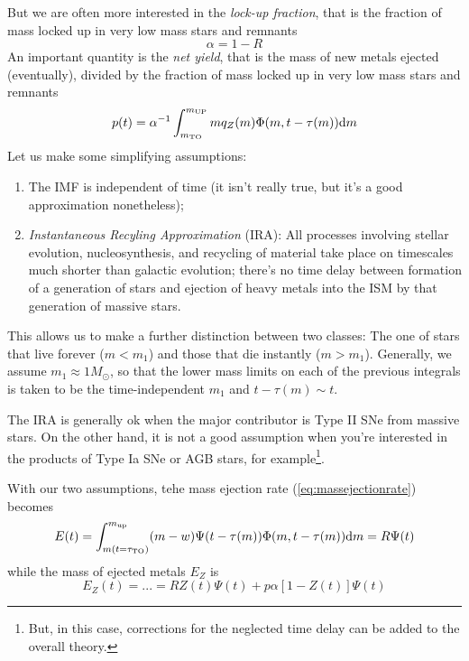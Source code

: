 But we are often more interested in the \emph{lock-up fraction}, that is the fraction of mass locked up in very low mass stars and remnants
\begin{equation}
    \alpha = 1-R
    \label{eq:lockup_fraction}
\end{equation}
An important quantity is the \emph{net yield}, that is the mass of new metals ejected (eventually), divided by the fraction of mass locked up in very low mass stars and remnants
\begin{equation}
    p(t) = \alpha^{-1}\int_{m_{\text{TO}}}^{m_{\text{UP}}} mq_{Z}(m)\Phi(m,t-\tau(m))\text{d}m
    \label{eq:netyield}
\end{equation}
Let us make some simplifying assumptions:
\begin{enumerate}
    \item The IMF is independent of time (it isn't really true, but it's a good approximation nonetheless);
    \item \emph{Instantaneous Recyling Approximation} (IRA): All processes involving stellar evolution, nucleosynthesis, and recycling of material take place on timescales much shorter than galactic evolution; there's no time delay between formation of a generation of stars and ejection of heavy metals into the ISM by that generation of massive stars.
\end{enumerate}
This allows us to make a further distinction between two classes: The one of stars that live forever ($m < m_{1}$) and those that die instantly ($m > m_{1}$). Generally, we assume $m_{1}\approx 1M_{\odot}$, so that the lower mass limits on each of the previous integrals is taken to be the time-independent $m_{1}$ and $t-\tau(m)\sim t$.
\par The IRA is generally ok when the major contributor is Type II SNe from massive stars. On the other hand, it is not a good assumption when you're interested in the products of Type Ia SNe or AGB stars, for example\footnote{But, in this case, corrections for the neglected time delay can be added to the overall theory.}.
\par With our two assumptions, tehe mass ejection rate (\ref{eq:massejectionrate}) becomes
\begin{equation}
    E(t) = \int_{m(t=\tau_{\text{TO}})}^{m_{\text{up}}} (m-w)\Psi(t-\tau(m))\Phi(m, t-\tau(m))\text{d}m = R\Psi(t)
    \label{eq:mer_ira}
\end{equation}
while the mass of ejected metals $E_{Z}$ is 
\begin{equation*}
    E_{Z}(t) = ... = RZ(t)\Psi(t)+p\alpha\left[1-Z(t)\right]\Psi(t)
\end{equation*}
